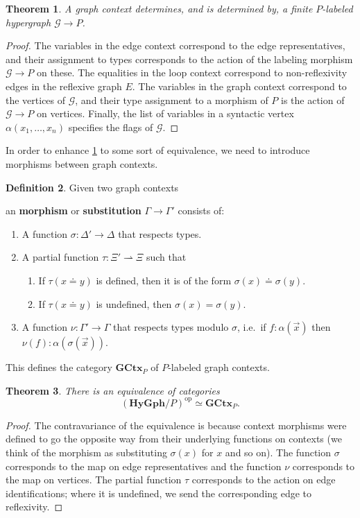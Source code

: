 \documentclass{article}
\newtheorem{thm}{Theorem}[section]
\theoremstyle{definition}
\newtheorem{defn}[thm]{Definition}
\theoremstyle{remark}
\def\G{\mathcal{G}}
\def\op{^{\mathrm{op}}}
\def\hy{\mathbf{HyGph}}
\def\GCtx{\mathbf{GCtx}}
\def\graph{\;\mathsf{graph}}
\let\types\vdash
\begin{document}
\begin{thm}\label{thm:ctx-hy}
  A graph context determines, and is determined by, a finite $P$-labeled hypergraph $\G\to P$.
\end{thm}
\begin{proof}
  The variables in the edge context correspond to the edge representatives, and their assignment to types corresponds to the action of the labeling morphism $\G\to P$ on these.
  The equalities in the loop context correspond to non-reflexivity edges in the reflexive graph $E$.
  The variables in the graph context correspond to the vertices of $\G$, and their type assignment to a morphism of $P$ is the action of $\G\to P$ on vertices.
  Finally, the list of variables in a syntactic vertex $\alpha(x_1,\dots,x_n)$ specifies the flags of $\G$.
\end{proof}

In order to enhance \cref{thm:ctx-hy} to some sort of equivalence, we need to introduce morphisms between graph contexts.

\begin{defn}
  Given two graph contexts
  an \textbf{morphism} or \textbf{substitution} $\Gamma\to\Gamma'$ consists of:
  \begin{enumerate}
  \item A function $\sigma : \Delta' \to \Delta$ that respects types.
  \item A partial function $\tau : \Xi' \rightharpoonup \Xi$ such that
    \begin{enumerate}
    \item If $\tau(x\doteq y)$ is defined, then it is of the form $\sigma(x)\doteq \sigma(y)$.
    \item If $\tau(x\doteq y)$ is undefined, then $\sigma(x)=\sigma(y)$.
    \end{enumerate}
  \item A function $\nu : \Gamma' \to \Gamma$ that respects types modulo $\sigma$, i.e.\ if $f:\alpha(\vec x)$ then $\nu(f) : \alpha(\sigma(\vec x))$.
  \end{enumerate}
  This defines the category $\GCtx_P$ of $P$-labeled graph contexts.
\end{defn}

\begin{thm}
  There is an equivalence of categories
  \[ (\hy/P)\op \simeq \GCtx_P. \]
\end{thm}
\begin{proof}
  The contravariance of the equivalence is because context morphisms were defined to go the opposite way from their underlying functions on contexts (we think of the morphism as substituting $\sigma(x)$ for $x$ and so on).
  The function $\sigma$ corresponds to the map on edge representatives and the function $\nu$ corresponds to the map on vertices.
  The partial function $\tau$ corresponds to the action on edge identifications; where it is undefined, we send the corresponding edge to reflexivity.
\end{proof}
\end{document}
